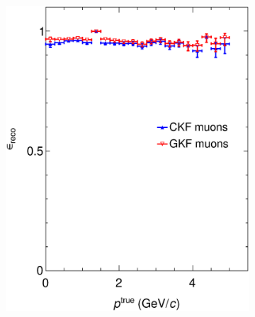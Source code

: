 \begin{figure}[t]
     \centering
     \begin{subfigure}{0.32\textwidth}
         \centering
         \includegraphics[width=\textwidth]{figures/ch5-KF_NDGAr/FullSample/Integration/EffVSp13.eps}
         \caption{}
         \label{fig:Eff13_Integration}
     \end{subfigure}
     \begin{subfigure}{0.32\textwidth}
         \centering

\end{subfigure}
\end{figure}
